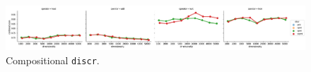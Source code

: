 \begin{figure}
  \centering

  \includegraphics[width=1.1\textwidth]{supplement/figures/compositional-interaction-discr}

  \caption{Compositional \texttt{discr}.}
  \label{fig:compositional-discr}
\end{figure}
